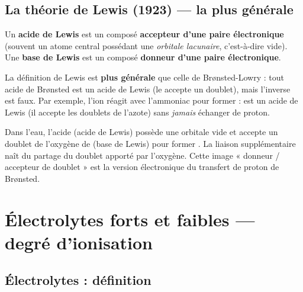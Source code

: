\documentclass[11pt,a4paper]{article}
\begin{document}
\subsection{La théorie de Lewis (1923) --- la plus générale}

\begin{definition}
Un \textbf{acide de Lewis} est un composé \textbf{accepteur d'une paire électronique} (souvent un atome
central possédant une \emph{orbitale lacunaire}, c'est-à-dire vide). \\
Une \textbf{base de Lewis} est un composé \textbf{donneur d'une paire électronique}.
\end{definition}

\begin{remarque}
La définition de Lewis est \textbf{plus générale} que celle de Brønsted-Lowry : tout acide de Brønsted est un
acide de Lewis (le  accepte un doublet), mais l'inverse est faux. Par exemple, l'ion  réagit
avec l'ammoniac  pour former \ce{[Ag(NH3)2]+} :  est un acide de Lewis (il accepte les
doublets de l'azote) sans \emph{jamais} échanger de proton.
\end{remarque}

\begin{exemple}
Dans l'eau, l'acide  (acide de Lewis) possède une orbitale vide et accepte un doublet de l'oxygène de
 (base de Lewis) pour former . La liaison  supplémentaire naît du partage du
doublet apporté par l'oxygène. Cette image « donneur / accepteur de doublet » est la version électronique du
transfert de proton de Brønsted.
\end{exemple}

\section{Électrolytes forts et faibles --- degré d'ionisation}

\subsection{Électrolytes : définition}
\end{document}
